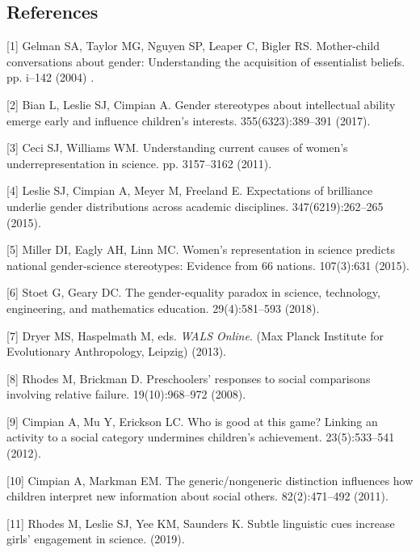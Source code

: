 \documentclass[9pt,twocolumn]{pnas-new}
\begin{document}
\subsection*{References}


[1] Gelman SA, Taylor MG, Nguyen SP, Leaper C, Bigler RS. Mother-child
  conversations about gender: Understanding the acquisition of essentialist
  beliefs.
 pp.
  i--142 (2004) .


[2] Bian L, Leslie SJ, Cimpian A. Gender stereotypes about intellectual
  ability emerge early and influence children's interests.
 355(6323):389--391  (2017).


[3] Ceci SJ, Williams WM. Understanding current causes of women's
  underrepresentation in science.
 pp. 3157--3162  (2011).


[4] Leslie SJ, Cimpian A, Meyer M, Freeland E. Expectations of brilliance
  underlie gender distributions across academic disciplines.
 347(6219):262--265 (2015).


[5] Miller DI, Eagly AH, Linn MC. Women's representation in science predicts
  national gender-science stereotypes: Evidence from 66 nations.
 107(3):631  (2015).


[6] Stoet G, Geary DC. The gender-equality paradox in science, technology,
  engineering, and mathematics education.
 29(4):581--593  (2018).


[7] Dryer MS, Haspelmath M, eds. {\em WALS Online}.
\newblock (Max Planck Institute for Evolutionary Anthropology, Leipzig) (2013).
  

[8] Rhodes M, Brickman D. Preschoolers' responses to social comparisons
  involving relative failure.
 19(10):968--972 (2008).

[9] Cimpian A, Mu Y, Erickson LC. Who is good at this game? {L}inking an
  activity to a social category undermines children's achievement.
 23(5):533--541  (2012).

[10] Cimpian A, Markman EM. The generic/nongeneric distinction influences how
  children interpret new information about social others.
 82(2):471--492  (2011).

[11] Rhodes M, Leslie SJ, Yee KM, Saunders K. Subtle linguistic cues increase
  girls' engagement in science.
 (2019).
\end{document}
